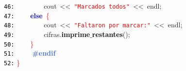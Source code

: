 \documentclass[a4paper,10pt]{scrartcl}
\begin{document}
{   \mbox{}\texttt{\textcolor{Black}{46:}} \ \ \ \ \ \ \ \ cout\ \textcolor{BrickRed}{\textless{}\textless{}}\ \texttt{\textcolor{Red}{"{}Marcados\ todos"{}}}\ \textcolor{BrickRed}{\textless{}\textless{}}\ endl\textcolor{BrickRed}{;} \\
   \mbox{}\texttt{\textcolor{Black}{47:}} \ \ \ \ \textbf{\textcolor{Blue}{else}}\ \textcolor{Red}{\{} \\
   \mbox{}\texttt{\textcolor{Black}{48:}} \ \ \ \ \ \ \ \ cout\ \textcolor{BrickRed}{\textless{}\textless{}}\ \texttt{\textcolor{Red}{"{}Faltaron\ por\ marcar:"{}}}\ \textcolor{BrickRed}{\textless{}\textless{}}\ endl\textcolor{BrickRed}{;} \\
   \mbox{}\texttt{\textcolor{Black}{49:}} \ \ \ \ \ \ \ \ cifras\textcolor{BrickRed}{.}\textbf{\textcolor{Black}{imprime$\_$restantes}}\textcolor{BrickRed}{();} \\
   \mbox{}\texttt{\textcolor{Black}{50:}} \ \ \ \ \textcolor{Red}{\}} \\
   \mbox{}\texttt{\textcolor{Black}{51:}} \textbf{\textcolor{RoyalBlue}{\ \ \ \ \#endif}} \\
   \mbox{}\texttt{\textcolor{Black}{52:}} \textcolor{Red}{\}}}
   
   
   
   
   
\end{document}
